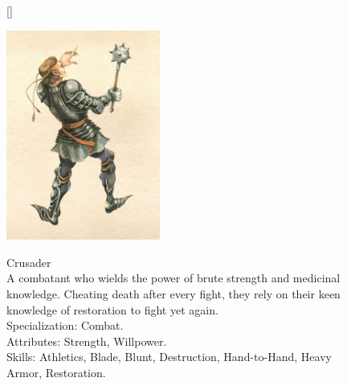 \documentclass[12pt]{book}
\begin{document}
\begin{figure}[H]
[\FBwidth]
{\caption*{Crusader\\

A combatant who wields the power of brute strength and medicinal knowledge. Cheating death after every fight, they rely on their keen knowledge of restoration to fight yet again.\\

Specialization: Combat.\\

Attributes: Strength, Willpower.\\

Skills: Athletics, Blade, Blunt, Destruction, Hand-to-Hand, Heavy Armor, Restoration.}\label{fig:test}}
{\includegraphics[width=0.45\textwidth]{Crusader.png}}
\end{figure}
\end{document}
